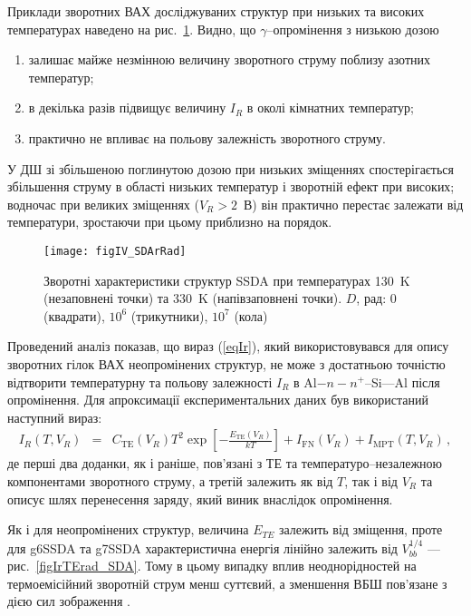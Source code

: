 Приклади зворотних ВАХ досліджуваних структур при низьких та високих температурах наведено на рис.~\ref{figIV_SDArRad}.
Видно, що $\gamma$--опромінення з низькою дозою
\begin{enumerate}[label=\asbuk*),leftmargin=0em,itemindent=1.5em]
\item залишає майже незмінною величину зворотного струму поблизу азотних температур;
\item в декілька разів підвищує величину $I_R$ в околі кімнатних температур;
\item практично не впливає на польову залежність зворотного струму.
\end{enumerate}
У ДШ зі збільшеною поглинутою дозою при низьких зміщеннях спостерігається збільшення струму в області низьких температур і зворотній ефект при високих;
водночас при великих зміщеннях ($V_R>2$~В) він практично перестає залежати від температури, зростаючи при цьому приблизно на порядок.


\begin{figure}
\center
\texttt{[image: figIV\_SDArRad]}
\caption{\label{figIV_SDArRad}
Зворотні характеристики структур SSDA при температурах 130~K (незаповнені точки)
та 330~K (напівзаповнені точки).
$D$, рад: 0 (квадрати), $10^6$ (трикутники), $10^7$ (кола)
}%
\end{figure}

Проведений аналіз показав, що вираз (\ref{eqIr}), який використовувався для опису зворотних гілок ВАХ неопромінених структур,
не може з достатньою точністю відтворити температурну та польову залежності $I_R$ в Al$-n-n^+$--Si---Al після опромінення.
Для апроксимації експериментальних даних був використаний наступний вираз:
\begin{eqnarray}
\label{eqIrRad}
I_R(T,V_R)&=&C_\mathrm{TE}(V_R)T^2\exp\left[-\frac{E_\mathrm{TE}(V_R)}{kT}\right]+I_\mathrm{FN}(V_R)+I_\mathrm{MPT}(T,V_R)\,,
\end{eqnarray}
де
перші два доданки, як і раніше,
пов'язані з ТЕ та температуро--незалежною компонентами зворотного струму,
а третій залежить як від $T$, так і від $V_R$ та описує шлях перенесення заряду, який виник внаслідок опромінення.

Як і для неопромінених структур,
величина $E_{TE}$ залежить від зміщення, проте для g6SSDA та g7SSDA характеристична енергія лінійно залежить від $V_{bb}^{1/4}$
 --- рис.~\ref{figIrTErad_SDA}.
Тому в цьому випадку вплив неоднорідностей
на термоемісійний зворотній струм менш суттєвий, а зменшення ВБШ пов’язане з дією сил зображення \cite{Rhoderick1988,Andrews}.

